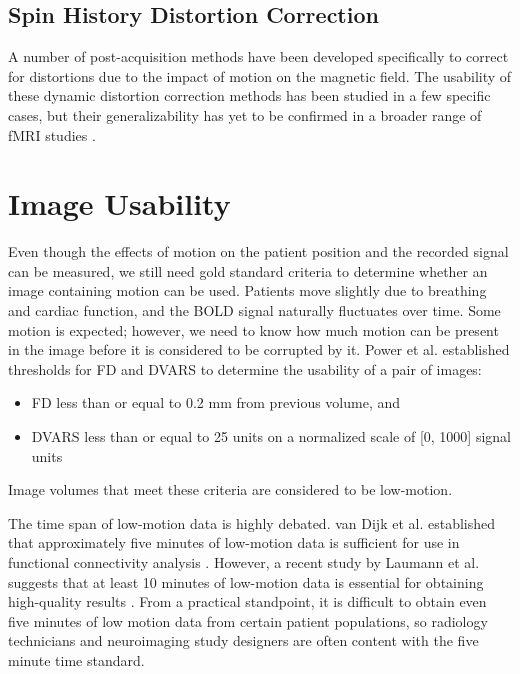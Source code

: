 \subsection{Spin History Distortion Correction}

A number of post-acquisition methods have been developed specifically to correct for distortions due to the impact of motion on the magnetic field. The usability of these dynamic distortion correction methods has been studied in a few specific cases, but their generalizability has yet to be confirmed in a broader range of fMRI studies \cite{Zaitsev2017}.

\section{Image Usability}



Even though the effects of motion on the patient position and the recorded signal can be measured, we still need gold standard criteria to determine whether an image containing motion can be used. Patients move slightly due to breathing and cardiac function, and the BOLD signal naturally fluctuates over time. Some motion is expected; however, we need to know how much motion can be present in the image before it is considered to be corrupted by it. Power et al. established thresholds for FD and DVARS to determine the usability of a pair of images:
\begin{itemize}
\item FD less than or equal to 0.2 mm from previous volume, and
\item DVARS less than or equal to 25 units on a normalized scale of [0, 1000] signal units \cite{Power2014}
\end{itemize}

Image volumes that meet these criteria are considered to be low-motion.

The time span of low-motion data is highly debated. van Dijk et al. established that approximately five minutes of low-motion data is sufficient for use in functional connectivity analysis \cite{VanDijk2012}. However, a recent study by Laumann et al. suggests that at least 10 minutes of low-motion data is essential for obtaining high-quality results \cite{Laumann2015}. From a practical standpoint, it is difficult to obtain even five minutes of low motion data from certain patient populations, so radiology technicians and neuroimaging study designers are often content with the five minute time standard. 

